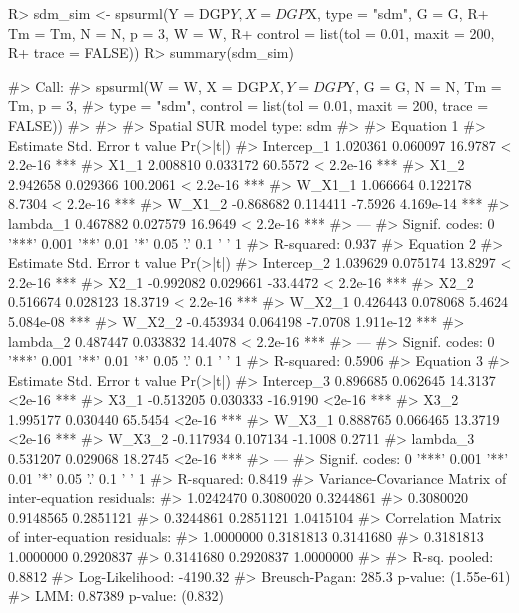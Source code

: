 \documentclass[article]{jss}
\begin{document}
\begin{CodeChunk}

\begin{CodeInput}
R> sdm_sim <- spsurml(Y = DGP$Y, X = DGP$X, type = "sdm", G = G, 
R+                    Tm = Tm, N = N, p = 3, W = W, 
R+                    control = list(tol = 0.01, maxit = 200, 
R+                                   trace = FALSE))
R> summary(sdm_sim)
\end{CodeInput}

\begin{CodeOutput}
#> Call:
#> spsurml(W = W, X = DGP$X, Y = DGP$Y, G = G, N = N, Tm = Tm, p = 3, 
#>     type = "sdm", control = list(tol = 0.01, maxit = 200, trace = FALSE))
#> 
#>  
#> Spatial SUR model type:  sdm 
#> 
#> Equation  1 
#>             Estimate Std. Error  t value  Pr(>|t|)    
#> Intercep_1  1.020361   0.060097  16.9787 < 2.2e-16 ***
#> X1_1        2.008810   0.033172  60.5572 < 2.2e-16 ***
#> X1_2        2.942658   0.029366 100.2061 < 2.2e-16 ***
#> W_X1_1      1.066664   0.122178   8.7304 < 2.2e-16 ***
#> W_X1_2     -0.868682   0.114411  -7.5926 4.169e-14 ***
#> lambda_1    0.467882   0.027579  16.9649 < 2.2e-16 ***
#> ---
#> Signif. codes:  0 '***' 0.001 '**' 0.01 '*' 0.05 '.' 0.1 ' ' 1
#> R-squared: 0.937 
#>   Equation  2 
#>             Estimate Std. Error  t value  Pr(>|t|)    
#> Intercep_2  1.039629   0.075174  13.8297 < 2.2e-16 ***
#> X2_1       -0.992082   0.029661 -33.4472 < 2.2e-16 ***
#> X2_2        0.516674   0.028123  18.3719 < 2.2e-16 ***
#> W_X2_1      0.426443   0.078068   5.4624 5.084e-08 ***
#> W_X2_2     -0.453934   0.064198  -7.0708 1.911e-12 ***
#> lambda_2    0.487447   0.033832  14.4078 < 2.2e-16 ***
#> ---
#> Signif. codes:  0 '***' 0.001 '**' 0.01 '*' 0.05 '.' 0.1 ' ' 1
#> R-squared: 0.5906 
#>   Equation  3 
#>             Estimate Std. Error  t value Pr(>|t|)    
#> Intercep_3  0.896685   0.062645  14.3137   <2e-16 ***
#> X3_1       -0.513205   0.030333 -16.9190   <2e-16 ***
#> X3_2        1.995177   0.030440  65.5454   <2e-16 ***
#> W_X3_1      0.888765   0.066465  13.3719   <2e-16 ***
#> W_X3_2     -0.117934   0.107134  -1.1008   0.2711    
#> lambda_3    0.531207   0.029068  18.2745   <2e-16 ***
#> ---
#> Signif. codes:  0 '***' 0.001 '**' 0.01 '*' 0.05 '.' 0.1 ' ' 1
#> R-squared: 0.8419 
#>   Variance-Covariance Matrix of inter-equation residuals:                              
#>  1.0242470 0.3080020 0.3244861
#>  0.3080020 0.9148565 0.2851121
#>  0.3244861 0.2851121 1.0415104
#> Correlation Matrix of inter-equation residuals:                              
#>  1.0000000 0.3181813 0.3141680
#>  0.3181813 1.0000000 0.2920837
#>  0.3141680 0.2920837 1.0000000
#> 
#>  R-sq. pooled: 0.8812 
#>  Log-Likelihood:  -4190.32
#>  Breusch-Pagan: 285.3  p-value: (1.55e-61) 
#>  LMM: 0.87389  p-value: (0.832)
\end{CodeOutput}
\end{CodeChunk}
\end{document}
